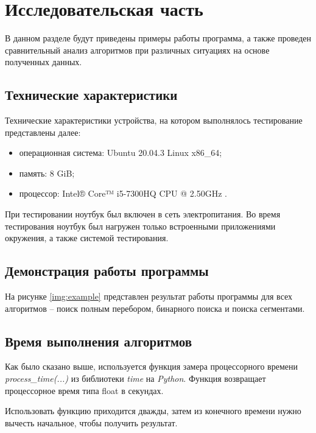 \chapter{Исследовательская часть}

В данном разделе будут приведены примеры работы программа, а также проведен сравнительный анализ алгоритмов при различных ситуациях на основе полученных данных.

\section{Технические характеристики}

Технические характеристики устройства, на котором выполнялось тестирование представлены далее:

\begin{itemize}
    \item операционная система: Ubuntu 20.04.3 \cite{ubuntu} Linux \cite{linux} x86\_64;
    \item память: 8 GiB;
    \item процессор: Intel® Core™ i5-7300HQ CPU @ 2.50GHz \cite{intel}.
\end{itemize}

При тестировании ноутбук был включен в сеть электропитания. Во время тестирования ноутбук был нагружен только встроенными приложениями окружения, а также системой тестирования.

\section{Демонстрация работы программы}

На рисунке \ref{img:example} представлен результат работы программы для всех алгоритмов -- поиск полным перебором, бинарного поиска и поиска сегментами.

\clearpage

\section{Время выполнения алгоритмов}

Как было сказано выше, используется функция замера процессорного времени  \textit{process\_time(...)} из библиотеки \textit{time} на \textit{Python}. Функция возвращает процессорное время типа float в секундах.

Использовать функцию приходится дважды, затем из конечного времени нужно вычесть начальное, чтобы получить результат.

